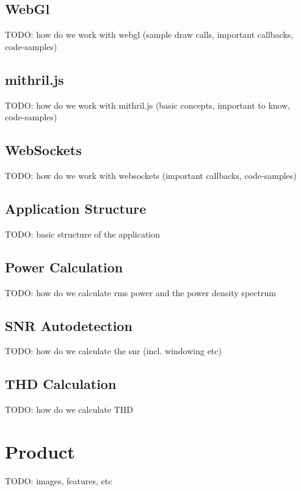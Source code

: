 \subsection{WebGl}

TODO: how do we work with webgl (sample draw calls, important callbacks, code-samples)

\subsection{mithril.js}

TODO: how do we work with mithril.js (basic concepts, important to know, code-samples)

\subsection{WebSockets}

TODO: how do we work with websockets (important callbacks, code-samples)

\subsection{Application Structure}

TODO: basic structure of the application

\subsection{Power Calculation}

TODO: how do we calculate rms power and the power density spectrum

\subsection{SNR Autodetection}

TODO: how do we calculate the snr (incl. windowing etc)

\subsection{THD Calculation}

TODO: how do we calculate THD

\section{Product}

TODO: images, features, etc